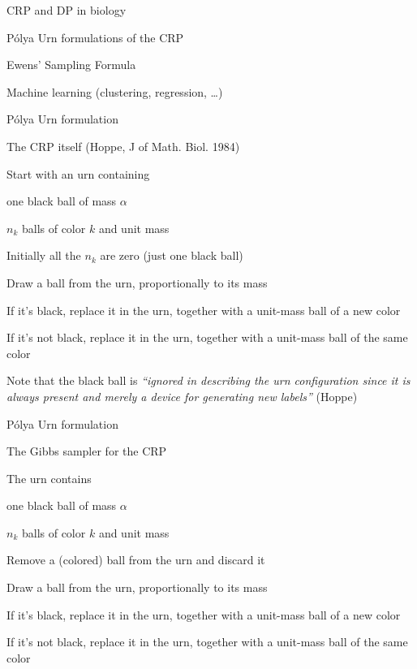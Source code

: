 \documentclass{beamer}
\begin{document}
\begin{frame}{CRP and DP in biology}

\itemb
\item P\'{o}lya Urn formulations of the CRP
\item Ewens' Sampling Formula
\item Machine learning (clustering, regression, \ldots)
\iteme

\end{frame}

\begin{frame}{P\'{o}lya Urn formulation}

The CRP itself (Hoppe, J of Math. Biol. 1984)
\itemb
\item Start with an urn containing
 \itemb
 \item one black ball of mass $\alpha$
 \item $n_k$ balls of color $k$ and unit mass
 \item Initially all the $n_k$ are zero (just one black ball)
 \iteme
\item Draw a ball from the urn, proportionally to its mass
 \itemb
 \item If it's black, replace it in the urn, together with a unit-mass ball of a new color
 \item If it's not black, replace it in the urn, together with a unit-mass ball of the same color
 \iteme
\item Note that the black ball is {\em ``ignored in describing the urn configuration since it is always present and merely a device for generating new labels''} (Hoppe)
\iteme

\end{frame}

\begin{frame}{P\'{o}lya Urn formulation}

The Gibbs sampler for the CRP
\itemb
\item The urn contains
 \itemb
 \item one black ball of mass $\alpha$
 \item $n_k$ balls of color $k$ and unit mass
 \iteme
\item Remove a (colored) ball from the urn and discard it
\item Draw a ball from the urn, proportionally to its mass
 \itemb
 \item If it's black, replace it in the urn, together with a unit-mass ball of a new color
 \item If it's not black, replace it in the urn, together with a unit-mass ball of the same color
 \iteme
\iteme

\end{frame}
\end{document}

